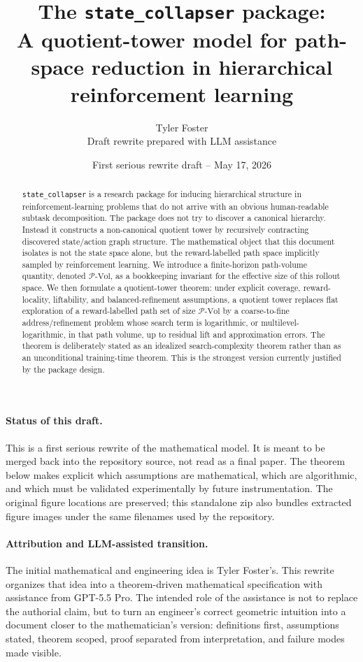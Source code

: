 \documentclass[11pt]{article}
\title{The \texttt{state\_collapser} package:\\A quotient-tower model for path-space reduction in hierarchical reinforcement learning}
\author{Tyler Foster\\[2pt]\small Draft rewrite prepared with LLM assistance}
\date{First serious rewrite draft -- May 17, 2026}
\newcommand{\PVol}{\mathcal{P}\text{-}\mathrm{Vol}}
\begin{document}
\maketitle

\begin{abstract}
\texttt{state\_collapser} is a research package for inducing hierarchical structure in reinforcement-learning problems that do not arrive with an obvious human-readable subtask decomposition.  The package does not try to discover a canonical hierarchy.  Instead it constructs a non-canonical quotient tower by recursively contracting discovered state/action graph structure.  The mathematical object that this document isolates is not the state space alone, but the reward-labelled path space implicitly sampled by reinforcement learning.  We introduce a finite-horizon path-volume quantity, denoted \(\PVol\), as a bookkeeping invariant for the effective size of this rollout space.  We then formulate a quotient-tower theorem: under explicit coverage, reward-locality, liftability, and balanced-refinement assumptions, a quotient tower replaces flat exploration of a reward-labelled path set of size \(\PVol\) by a coarse-to-fine address/refinement problem whose search term is logarithmic, or multilevel-logarithmic, in that path volume, up to residual lift and approximation errors.  The theorem is deliberately stated as an idealized search-complexity theorem rather than as an unconditional training-time theorem.  This is the strongest version currently justified by the package design.
\end{abstract}

\paragraph{Status of this draft.}
This is a first serious rewrite of the mathematical model.  It is meant to be merged back into the repository source, not read as a final paper.  The theorem below makes explicit which assumptions are mathematical, which are algorithmic, and which must be validated experimentally by future instrumentation.  The original figure locations are preserved; this standalone zip also bundles extracted figure images under the same filenames used by the repository.

\paragraph{Attribution and LLM-assisted transition.}
The initial mathematical and engineering idea is Tyler Foster's.  This rewrite organizes that idea into a theorem-driven mathematical specification with assistance from GPT-5.5 Pro.  The intended role of the assistance is not to replace the authorial claim, but to turn an engineer's correct geometric intuition into a document closer to the mathematician's version: definitions first, assumptions stated, theorem scoped, proof separated from interpretation, and failure modes made visible.
\end{document}
